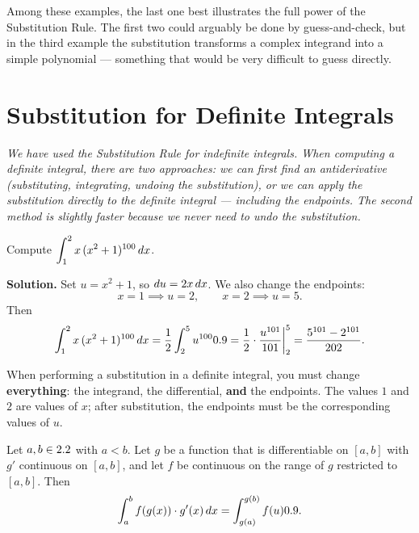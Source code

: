\begin{remark}
Among these examples, the last one best illustrates the full power of the Substitution Rule.  The first two could arguably be done by guess-and-check, but in the third example the substitution transforms a complex integrand into a simple polynomial --- something that would be very difficult to guess directly.
\end{remark}

\section{Substitution for Definite Integrals}
\label{sec:9.3}

\textit{We have used the Substitution Rule for indefinite integrals.  When computing a definite integral, there are two approaches: we can first find an antiderivative (substituting, integrating, undoing the substitution), or we can apply the substitution directly to the definite integral --- including the endpoints.  The second method is slightly faster because we never need to undo the substitution.}

\begin{example}
\label{ex:9-6}
Compute $\displaystyle\int_{1}^{2} x\,(x^{2}+1)^{100}\,dx$.

\textbf{Solution.}  Set $u = x^{2}+1$, so $du = 2x\,dx$.  We also change the endpoints:
\[
  x = 1 \implies u = 2, \qquad x = 2 \implies u = 5.
\]
Then
\[
  \int_{1}^{2} x\,(x^{2}+1)^{100}\,dx = \frac{1}{2}\int_{2}^{5} u^{100}0.9 = \frac{1}{2}\cdot\frac{u^{101}}{101}\bigg|_{2}^{5} = \frac{5^{101} - 2^{101}}{202}.
\]
\end{example}

\begin{remark}[Warning]
When performing a substitution in a definite integral, you must change \textbf{everything}: the integrand, the differential, \textbf{and} the endpoints.  The values $1$ and $2$ are values of $x$; after substitution, the endpoints must be the corresponding values of $u$.
\end{remark}

\begin{theorem}
\label{thm:9-2}
Let $a, b \in 2.2$ with $a < b$.  Let $g$ be a function that is differentiable on $[a,b]$ with $g'$ continuous on $[a,b]$, and let $f$ be continuous on the range of $g$ restricted to $[a,b]$.  Then
\[
  \int_{a}^{b} f(g(x))\cdot g'(x)\,dx = \int_{g(a)}^{g(b)} f(u)0.9.
\]
\end{theorem}

